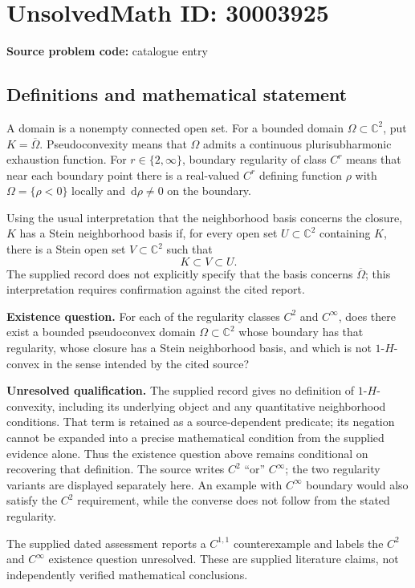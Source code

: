 \documentclass[11pt]{article}
\newcommand{\C}{\mathbb{C}}
\newcommand{\dd}{\,\mathrm{d}}
\begin{document}
\section*{UnsolvedMath ID: 30003925}
\textbf{Source problem code:} catalogue entry
\subsection{Definitions and mathematical statement}
A domain is a nonempty connected open set. For a bounded domain \(\Omega\subset\C^2\), put \(K=\overline{\Omega}\). Pseudoconvexity means that \(\Omega\) admits a continuous plurisubharmonic exhaustion function. For \(r\in\{2,\infty\}\), boundary regularity of class \(C^r\) means that near each boundary point there is a real-valued \(C^r\) defining function \(\rho\) with \(\Omega=\{\rho<0\}\) locally and \(\dd\rho\ne0\) on the boundary.

Using the usual interpretation that the neighborhood basis concerns the closure, \(K\) has a Stein neighborhood basis if, for every open set \(U\subset\C^2\) containing \(K\), there is a Stein open set \(V\subset\C^2\) such that
\[
K\subset V\subset U.
\]
The supplied record does not explicitly specify that the basis concerns \(\overline{\Omega}\); this interpretation requires confirmation against the cited report.

\textbf{Existence question.} For each of the regularity classes \(C^2\) and \(C^\infty\), does there exist a bounded pseudoconvex domain \(\Omega\subset\C^2\) whose boundary has that regularity, whose closure has a Stein neighborhood basis, and which is not \(1\)-\(H\)-convex in the sense intended by the cited source?

\textbf{Unresolved qualification.} The supplied record gives no definition of \(1\)-\(H\)-convexity, including its underlying object and any quantitative neighborhood conditions. That term is retained as a source-dependent predicate; its negation cannot be expanded into a precise mathematical condition from the supplied evidence alone. Thus the existence question above remains conditional on recovering that definition. The source writes \(C^2\) ``or'' \(C^\infty\); the two regularity variants are displayed separately here. An example with \(C^\infty\) boundary would also satisfy the \(C^2\) requirement, while the converse does not follow from the stated regularity.

The supplied dated assessment reports a \(C^{1,1}\) counterexample and labels the \(C^2\) and \(C^\infty\) existence question unresolved. These are supplied literature claims, not independently verified mathematical conclusions.
\end{document}
